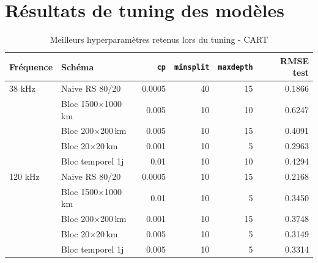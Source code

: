 \documentclass[11pt,a4paper,oneside]{report}
\begin{document}
	\section{Résultats de tuning des modèles}
	\label{annexe:tuning_res}
	\begin{table}[H]
		\centering
		\small
		\begin{tabularx}{\textwidth}{l l r r r r}
			\toprule
			Fr\'equence & Sch\'ema & \texttt{cp} & \texttt{minsplit} & \texttt{maxdepth} & RMSE test \\
			\midrule
			38 kHz & Naive RS 80/20 & 0.0005 &    40 &    15 & 0.1866 \\
			& Bloc 1500$\times$1000\,km & 0.005 &    10 &    10 & 0.6247 \\
			& Bloc 200$\times$200\,km & 0.005 &    10 &    15 & 0.4091 \\
			& Bloc 20$\times$20\,km & 0.001 &    10 &     5 & 0.2963 \\
			& Bloc temporel 1j &  0.01 &    10 &    10 & 0.4294 \\
			\midrule
			120 kHz & Naive RS 80/20 & 0.0005 &    10 &    15 & 0.2168 \\
			& Bloc 1500$\times$1000\,km &  0.01 &    10 &     5 & 0.3450 \\
			& Bloc 200$\times$200\,km & 0.001 &    10 &    15 & 0.3748 \\
			& Bloc 20$\times$20\,km & 0.005 &    10 &     5 & 0.3149 \\
			& Bloc temporel 1j & 0.005 &    10 &     5 & 0.3314 \\
			\bottomrule
		\end{tabularx}
		\caption{Meilleurs hyperparam\`etres retenus lors du tuning - CART}
		\label{tab:tuning_summary_cart}
	\end{table}
	
\end{document}
